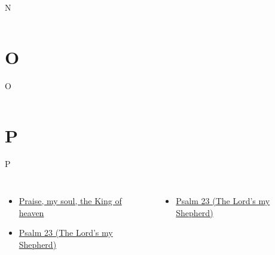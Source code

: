 \documentclass{beamer}
\begin{document}
\begin{frame}{N}
\begin{columns}

    


    


\end{columns}

\end{frame}

\section{O}

\begin{frame}{O}
\begin{columns}

    


    


\end{columns}

\end{frame}

\section{P}

\begin{frame}{P}
\begin{columns}
    \begin{itemize}
    \item \hyperlink{Praise, my soul, the King of heaven[]1}{Praise, my soul, the King of heaven }
    \item \hyperlink{The Lord's my Shepherd['Psalm 23'](Townend)1}{Psalm 23 (The Lord's my Shepherd)}
\end{itemize}
    \begin{itemize}
    \item \hyperlink{The Lord's my Shepherd['Psalm 23'](Trad)1}{Psalm 23 (The Lord's my Shepherd)}
\end{itemize}


\end{columns}

\end{frame}
\end{document}
